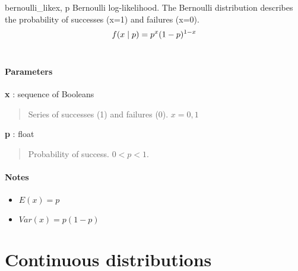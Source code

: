 \hypertarget{pymc.distributions.bernoulli_like}{}
\begin{funcdesc}{bernoulli\_like}{x, p}
Bernoulli log-likelihood. The Bernoulli distribution describes the probability of successes (x=1) and
failures (x=0).
\begin{gather}
\begin{split}f(x \mid p) = p^{x} (1-p)^{1-x}\end{split}\notag\\\begin{split}\end{split}\notag
\end{gather}
\paragraph{Parameters}
\begin{paramlist}
\item[] \textbf{x} : sequence of Booleans
\begin{quote}

Series of successes (1) and failures (0). $x=0,1$
\end{quote}

\item[] \textbf{p} : float
\begin{quote}

Probability of success. $0 < p < 1$.
\end{quote}
\end{paramlist}
\paragraph{Notes}
\begin{itemize}
\item {} 
$E(x)= p$

\item {} 
$Var(x)= p(1-p)$

\end{itemize}

\end{funcdesc}

\section{Continuous distributions}


